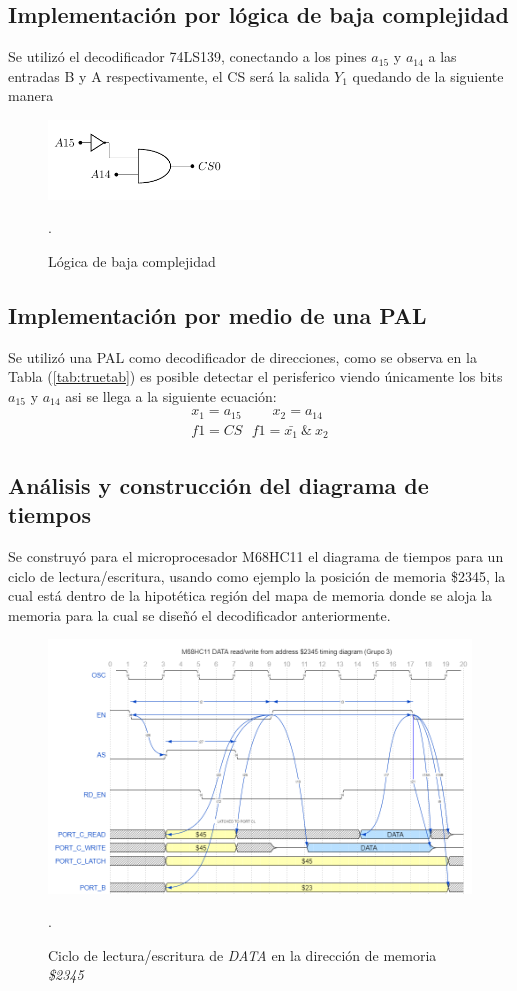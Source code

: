 \subsection{Implementación por lógica de baja complejidad}
Se utilizó el decodificador 74LS139, conectando a los pines $a_{15}$ y $a_{14}$ a las entradas B y A respectivamente, el CS será la salida $Y_1$ quedando de la siguiente manera
\begin{figure}[H]
  \centering
  \includegraphics[width=0.5\textwidth,page = 2]{ImagenesEjercicio1/Circuits.pdf}
  \caption{Lógica de baja complejidad}.
  \label{fig:circdec}
\end{figure}
\subsection{Implementación por medio de una PAL}
Se utilizó una PAL como decodificador de direcciones, como se observa en la Tabla (\ref{tab:truetab}) es posible detectar el perisferico viendo únicamente los bits $a_{15}$ y $a_{14}$ asi se llega a la siguiente ecuación:
\begin{align}
x_1 = a_{15} \ \ \  \  \  \  \  \  \  \ x_2=a_{14} \\
f1=CS \ \ \ f1= \bar{x_1} \  \&  \ x_2
\end{align}

\subsection{Análisis y construcción del diagrama de tiempos}
Se construyó para el microprocesador M68HC11 el diagrama de tiempos para un ciclo de lectura/escritura, usando como ejemplo la posición de memoria \$2345, la cual está dentro de la hipotética región del mapa de memoria donde se aloja la memoria para la cual se diseñó el decodificador anteriormente.

\begin{figure}[H]
  \centering
  \includegraphics[width=\textwidth]{ImagenesEjercicio1/diagtiempos.png}
  \caption{Ciclo de lectura/escritura de \textit{DATA} en la dirección de memoria \textit{\$2345}}.
  \label{diagtiempos}
\end{figure}
 
